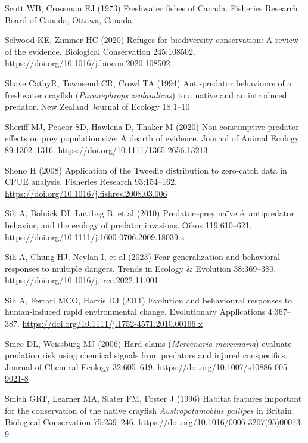 \documentclass[
  12pt,
  a4paper,
  oneside]{scrbook}
\newlength{\cslhangindent}
\newenvironment{CSLReferences}[2] %
 {\begin{list}{}{%
  \setlength{\itemindent}{0pt}
  \setlength{\leftmargin}{0pt}
  \setlength{\parsep}{0pt}
  \ifodd #1
   \setlength{\leftmargin}{\cslhangindent}
   \setlength{\itemindent}{-1\cslhangindent}
  \fi
  \setlength{\itemsep}{#2\baselineskip}}}
 {\end{list}}
\renewenvironment{CSLReferences}[2]
   {\begin{list}{}{%
    \setlength{\itemindent}{0pt}
    \setlength{\leftmargin}{0pt}
    \setlength{\parsep}{0pt}
    \ifodd #1
     \setlength{\leftmargin}{\cslhangindent}
     \setlength{\itemindent}{-1\cslhangindent}
    \fi
    \setlength{\itemsep}{0.3\baselineskip}}}
   {\end{list}}%
\begin{document}
\begin{CSLReferences}{1}{1}
Scott WB, Crossman EJ (1973) Freshwater fishes of {Canada}. Fisheries
Research Board of Canada, Ottawa, Canada

Selwood KE, Zimmer HC (2020) Refuges for biodiversity conservation: A
review of the evidence. Biological Conservation 245:108502.
\url{https://doi.org/10.1016/j.biocon.2020.108502}

Shave CathyR, Townsend CR, Crowl TA (1994) Anti-predator behaviours of a
freshwater crayfish ({\emph{Paranephrops zealandicus}}) to a native and
an introduced predator. New Zealand Journal of Ecology 18:1--10

Sheriff MJ, Peacor SD, Hawlena D, Thaker M (2020) Non-consumptive
predator effects on prey population size: A dearth of evidence. Journal
of Animal Ecology 89:1302--1316.
\url{https://doi.org/10.1111/1365-2656.13213}

Shono H (2008) Application of the {Tweedie} distribution to zero-catch
data in {CPUE} analysis. Fisheries Research 93:154--162.
\url{https://doi.org/10.1016/j.fishres.2008.03.006}

Sih A, Bolnick DI, Luttbeg B, et al (2010) Predator--prey naïveté,
antipredator behavior, and the ecology of predator invasions. Oikos
119:610--621. \url{https://doi.org/10.1111/j.1600-0706.2009.18039.x}

Sih A, Chung HJ, Neylan I, et al (2023) Fear generalization and
behavioral responses to multiple dangers. Trends in Ecology \& Evolution
38:369--380. \url{https://doi.org/10.1016/j.tree.2022.11.001}

Sih A, Ferrari MCO, Harris DJ (2011) Evolution and behavioural responses
to human‐induced rapid environmental change. Evolutionary Applications
4:367--387. \url{https://doi.org/10.1111/j.1752-4571.2010.00166.x}

Smee DL, Weissburg MJ (2006) Hard clams ({\emph{Mercenaria mercenaria}})
evaluate predation risk using chemical signals from predators and
injured conspecifics. Journal of Chemical Ecology 32:605--619.
\url{https://doi.org/10.1007/s10886-005-9021-8}

Smith GRT, Learner MA, Slater FM, Foster J (1996) Habitat features
important for the conservation of the native crayfish
{\emph{Austropotamobius pallipes}} in {Britain}. Biological Conservation
75:239--246. \url{https://doi.org/10.1016/0006-3207(95)00073-9}


\end{CSLReferences}
\end{document}
